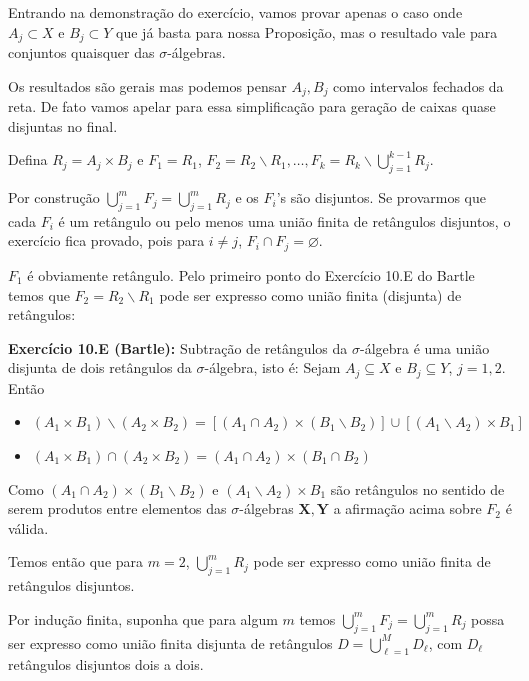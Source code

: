 \documentclass[12pt,letterpaper]{article}
\let\emptyset\varnothing
\newcommand{\bd}[1]{\boldsymbol{#1}}
\begin{document}
\begin{appendices}
			Entrando na demonstração do exercício, vamos provar apenas o caso onde $A_j\subset X$ e $B_j\subset Y$ que já basta para nossa Proposição, mas o resultado vale para conjuntos quaisquer das $\sigma$-álgebras.
			
			Os resultados são gerais mas podemos pensar $A_j,B_j$ como intervalos fechados da reta. De fato vamos apelar para essa simplificação para geração de caixas quase disjuntas no final. 
			
			Defina $R_j=A_j\times B_j$ e $F_1=R_1$, $F_2=R_2\backslash R_1,\ldots, F_k=R_k\backslash\bigcup_{j=1}^{k-1}R_j$.
			
			Por construção $\displaystyle\bigcup_{j=1}^{m}F_j=\bigcup_{j=1}^{m}R_j$ e os $F_i$'s são disjuntos. Se provarmos que cada $F_i$ é um retângulo ou pelo menos uma união finita de retângulos disjuntos, o exercício fica provado, pois para $i\neq j$, $F_i\cap F_j=\emptyset$.
			
			$F_1$ é obviamente retângulo. Pelo primeiro ponto do Exercício 10.E do Bartle\cite{bartle2014elements} temos que $F_2=R_2\backslash R_1$ pode ser expresso como união finita (disjunta) de retângulos:
			
			\textbf{Exercício 10.E (Bartle):} Subtração de retângulos da $\sigma$-álgebra é uma união disjunta de dois retângulos da $\sigma$-álgebra, isto é:
			Sejam $A_j\subseteq X$ e $B_j\subseteq Y$, $j=1,2$. Então
			\begin{itemize}
				\item $(A_1\times B_1)\backslash(A_2\times B_2)=[(A_1\cap A_2)\times (B_1\backslash B_2)]\cup[(A_1\backslash A_2)\times B_1]$
				\item $(A_1\times B_1)\cap(A_2\times B_2)=(A_1\cap A_2)\times(B_1\cap B_2)$
			\end{itemize}
			
			Como $(A_1\cap A_2)\times (B_1\backslash B_2)$ e $(A_1\backslash A_2)\times B_1$ são retângulos no sentido de serem produtos entre elementos das $\sigma$-álgebras $\bd X,\bd Y$ a afirmação acima sobre $F_2$ é válida.
			
			Temos então que para $m=2$, $\bigcup_{j=1}^{m}R_j$ pode ser expresso como união finita de retângulos disjuntos.
			
			Por indução finita, suponha que para algum $m$ temos $\bigcup_{j=1}^{m}F_j=\bigcup_{j=1}^{m}R_j$ possa ser expresso como união finita disjunta de retângulos $D=\bigcup_{\ell=1}^{M} D_{\ell}$, com $D_{\ell}$ retângulos disjuntos dois a dois.
			

\end{appendices}
\end{document}
